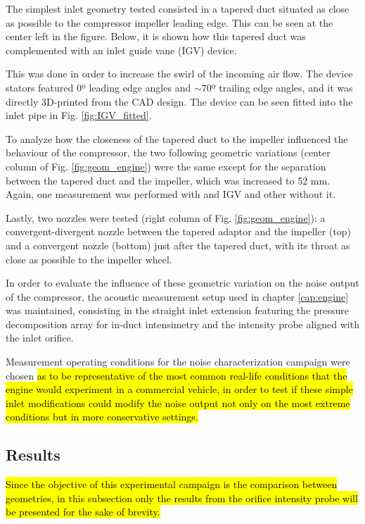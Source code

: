 The simplest inlet geometry tested consisted in a tapered duct situated as close as possible to the compressor impeller leading edge. This can be seen at the center left in the figure. Below, it is shown how this tapered duct was complemented with an inlet guide vane (IGV) device.

This was done in order to increase the swirl of the incoming air flow. The device stators featured 0º leading edge angles and $\sim 70$º trailing edge angles, and it was directly 3D-printed from the CAD design. The device can be seen fitted into the inlet pipe in Fig. \ref{fig:IGV_fitted}.

To analyze how the closeness of the tapered duct to the impeller influenced the behaviour of the compressor, the two following geometric variations (center column of Fig. \ref{fig:geom_engine}) were the same except for the separation between the tapered duct and the impeller, which was increased to 52 mm. Again, one measurement was performed with and IGV and other without it.

Lastly, two nozzles were tested (right column of Fig. \ref{fig:geom_engine}): a convergent-divergent nozzle between the tapered adaptor and the impeller (top) and a convergent nozzle (bottom) just after the tapered duct, with its throat as close as possible to the impeller wheel.

In order to evaluate the influence of these geometric variation on the noise output of the compressor, the acoustic measurement setup used in chapter \ref{cap:engine} was maintained, consisting in the straight inlet extension featuring the pressure decomposition array for in-duct intensimetry and the intensity probe aligned with the inlet orifice.

Measurement operating conditions for the noise characterization campaign were chosen \hl{as to be representative of the most common real-life conditions that the engine would experiment in a commercial vehicle, in order to test if these simple inlet modifications could modify the noise output not only on the most extreme conditions but in more conservative settings.}

\subsection{Results}

\hl{Since the objective of this experimental campaign is the comparison between geometries, in this subsection only the results from the orifice intensity probe will be presented for the sake of brevity.}

